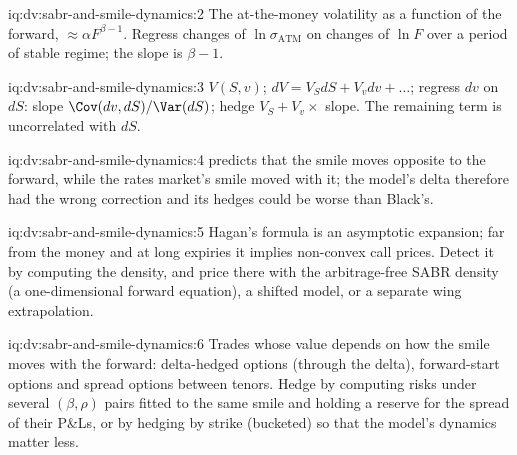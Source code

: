 \begin{solution}{iq:dv:sabr-and-smile-dynamics:2}
The at-the-money volatility as a function of the forward, $\approx\alpha F^{\beta-1}$. Regress changes of
$\ln\sigma_{\mathrm{ATM}}$ on changes of $\ln F$ over a period of stable regime; the slope is $\beta-1$.
\end{solution}

\begin{solution}{iq:dv:sabr-and-smile-dynamics:3}
$V(S,v)$; $dV=V_SdS+V_vdv+\dots$; regress $dv$ on $dS$: slope $\Cov(dv,dS)/\Var(dS)$; hedge $V_S+V_v\times$ slope. The
remaining term is uncorrelated with $dS$.
\end{solution}

\begin{solution}{iq:dv:sabr-and-smile-dynamics:4}
 predicts that the smile moves opposite to the forward, while the rates market's smile moved with it; the
model's delta therefore had the wrong correction and its hedges could be worse than Black's.
\end{solution}

\begin{solution}{iq:dv:sabr-and-smile-dynamics:5}
Hagan's formula is an asymptotic expansion; far from the money and at long expiries it implies non-convex call prices.
Detect it by computing the density, and price there with the arbitrage-free SABR density (a one-dimensional forward equation),
a shifted model, or a separate wing extrapolation.
\end{solution}

\begin{solution}{iq:dv:sabr-and-smile-dynamics:6}
Trades whose value depends on how the smile moves with the forward: delta-hedged options (through the delta), forward-start
options and spread options between tenors. Hedge by computing risks under several $(\beta,\rho)$ pairs fitted to the same smile
and holding a reserve for the spread of their P\&Ls, or by hedging  by strike (bucketed) so that the model's dynamics matter
less.
\end{solution}
